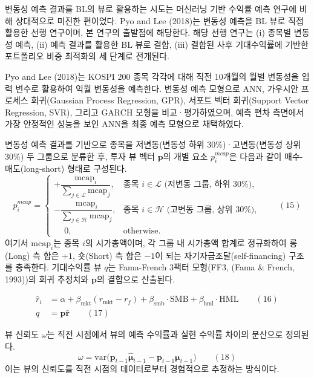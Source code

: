 \documentclass{article}
\begin{document}
변동성 예측 결과를 BL의 뷰로 활용하는 시도는 머신러닝 기반 수익률 예측 연구에 비해 상대적으로 미진한 편이었다. Pyo and Lee (2018)는 변동성 예측을 BL 뷰로 직접 활용한 선행 연구이며, 본 연구의 출발점에 해당한다. 해당 선행 연구는 (i) 종목별 변동성 예측, (ii) 예측 결과를 활용한 BL 뷰로 결합, (iii) 결합된 사후 기대수익률에 기반한 포트폴리오 비중 최적화의 세 단계로 전개된다.

Pyo and Lee (2018)는 KOSPI 200 종목 각각에 대해 직전 10개월의 월별 변동성을 입력 변수로 활용하여 익월 변동성을 예측한다. 변동성 예측 모형으로 ANN, 가우시안 프로세스 회귀(Gaussian Process Regression, GPR), 서포트 벡터 회귀(Support Vector Regression, SVR), 그리고 GARCH 모형을 비교·평가하였으며, 예측 편차 측면에서 가장 안정적인 성능을 보인 ANN을 최종 예측 모형으로 채택하였다.

변동성 예측 결과를 기반으로 종목을 저변동(변동성 하위 30\%)·고변동(변동성 상위 30\%) 두 그룹으로 분류한 후, 투자 뷰 벡터 $\mathbf{p}$의 개별 요소  $p_i^{mcap}$은 다음과 같이 매수-매도(long-short) 형태로 구성된다.
\begin{equation}
    p_i^{mcap} = \begin{cases}
    +\dfrac{\mathrm{mcap}_i}{\sum_{j \in \mathcal{L}} \mathrm{mcap}_j},  & \text{종목 } i \in \mathcal{L} \text{ (저변동 그룹, 하위 30\%)} ,\\[8pt]
    -\dfrac{\mathrm{mcap}_i}{\sum_{j \in \mathcal{H}} \mathrm{mcap}_j}, & \text{종목 } i \in \mathcal{H} \text{ (고변동 그룹, 상위 30\%)}, \\[6pt]
    \phantom{+}0,                & \text{otherwise}.
\end{cases} \qquad(15)\end{equation}
여기서 $\mathrm{mcap}_i$는 종목 $i$의 시가총액이며, 각 그룹 내 시가총액 합계로 정규화하여 롱(Long) 측 합은 $+1$, 숏(Short) 측 합은 $-1$이 되는 자기자금조달(self-financing) 구조를 충족한다. 기대수익률 뷰 $q$는 Fama-French 3팩터 모형(FF3, (Fama & French, 1993))의 회귀 추정치와 $\mathbf{p}$의 결합으로 산출된다.

\begin{align}
\hat{r}_i &= \alpha + \beta_{\text{mkt}}(r_{\text{mkt}} - r_f)
           + \beta_{\text{smb}} \cdot \text{SMB}
           + \beta_{\text{hml}} \cdot \text{HML} \qquad(16)\\
q &= \mathbf{p} \hat{\mathbf{r}} \qquad(17)\end{align}

뷰 신뢰도 $\omega$는 직전 시점에서 뷰의 예측 수익률과 실현 수익률 차이의 분산으로 정의된다.
\begin{equation}
\omega = \mathrm{var}\bigl(\mathbf{p}_{t-1} \hat{\boldsymbol{\mu}}_{t-1}
       - \mathbf{p}_{t-1} \boldsymbol{\mu}_{t-1}\bigr) \qquad(18)\end{equation}
이는 뷰의 신뢰도를 직전 시점의 데이터로부터 경험적으로 추정하는 방식이다.
\end{document}
